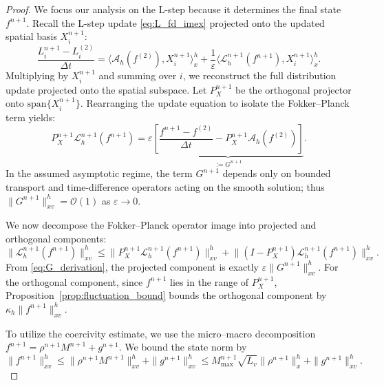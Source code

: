\documentclass[10pt,a4paper]{amsart}
\begin{document}
\begin{proof}
We focus our analysis on the L-step because it determines the final state $f^{n+1}$. Recall the L-step update \eqref{eq:L_fd_imex} projected onto the updated spatial basis ${X}_i^{n+1}$:
\[
  \frac{L_i^{n+1} - L_i^{(2)}}{\Delta t} = \langle \mathcal{A}_h(f^{(2)}), {X}_i^{n+1} \rangle_x^h + \frac{1}{\varepsilon} \langle \mathcal{L}_{h}^{n+1}(f^{n+1}), {X}_i^{n+1} \rangle_x^h.
\]
Multiplying by ${X}_i^{n+1}$ and summing over $i$, we reconstruct the full distribution update projected onto the spatial subspace. Let $P_X^{n+1}$ be the orthogonal projector onto $\mathrm{span}\{{X}_i^{n+1}\}$. Rearranging the update equation to isolate the Fokker--Planck term yields:
\begin{equation}\label{eq:G_derivation}
  P_X^{n+1}\mathcal{L}_{h}^{n+1}(f^{n+1}) = \varepsilon \underbrace{\left[ \frac{f^{n+1} - f^{(2)}}{\Delta t} - P_X^{n+1}\mathcal{A}_h(f^{(2)}) \right]}_{:= G^{n+1}}.
\end{equation}
In the assumed asymptotic regime, the term $G^{n+1}$ depends only on bounded transport and time-difference operators acting on the smooth solution; thus $\|G^{n+1}\|_{xv}^h = \mathcal{O}(1)$ as $\varepsilon \to 0$.

We now decompose the Fokker--Planck operator image into projected and orthogonal components:
\[
  \big\|\mathcal L_{h}^{n+1}(f^{n+1})\big\|_{xv}^h \le \big\|P_X^{n+1}\mathcal L_{h}^{n+1}(f^{n+1})\big\|_{xv}^h + \big\|(I-P_X^{n+1})\mathcal L_{h}^{n+1}(f^{n+1})\big\|_{xv}^h.
\]
From \eqref{eq:G_derivation}, the projected component is exactly $\varepsilon \|G^{n+1}\|_{xv}^h$. For the orthogonal component, since $f^{n+1}$ lies in the range of $P_X^{n+1}$, Proposition~\ref{prop:fluctuation_bound} bounds the orthogonal component by $\kappa_h \|f^{n+1}\|_{xv}^h$.

To utilize the coercivity estimate, we use the micro--macro decomposition $f^{n+1} = \rho^{n+1} M^{n+1} + g^{n+1}$. We bound the state norm by
\[
  \|f^{n+1}\|_{xv}^h \le \|\rho^{n+1}M^{n+1}\|_{xv}^h + \|g^{n+1}\|_{xv}^h \le M_{\max}^{n+1}\sqrt{L_v}\|\rho^{n+1}\|_x^h + \|g^{n+1}\|_{xv}^h.
\]


\end{proof}
\end{document}
